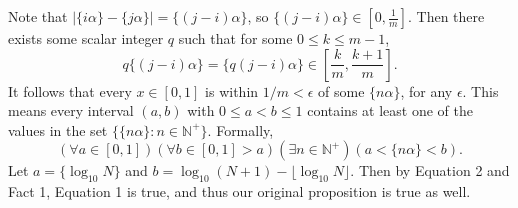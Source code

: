 \documentclass{article}
\begin{document}
    \vspace{2mm}
    Note that $|\{i\alpha\} - \{j\alpha\}| = \{(j - i) \alpha\}$, so $\{(j - i) \alpha\} \in \left[0, \frac{1}{m}\right]$. Then there exists some scalar integer $q$ such that for some $0 \le k \le m - 1$, $$q\{(j - i) \alpha\} = \{q(j - i) \alpha\} \in \left[\frac{k}{m}, \frac{k + 1}{m}\right].$$ It follows that every $x \in [0, 1]$ is within $1/m < \epsilon$ of some $\{n\alpha\}$, for any $\epsilon$. This means every interval $(a, b)$ with $0 \le a < b \le 1$ contains at least one of the values in the set  $\{\{n\alpha\} : n \in \mathbb{N}^{+}\}$. Formally, 
    \begin{equation}
        (\forall a \in [0, 1])(\forall b \in [0, 1] > a)(\exists n \in \mathbb{N}^{+})(a < \{n\alpha\} < b).
    \end{equation}
    Let $a = \{\log_{10}N\}$ and $b = \log_{10}(N + 1) - \lfloor \log_{10}N \rfloor$. Then by Equation 2 and Fact 1, Equation 1 is true, and thus our original proposition is true as well.
\end{document}
